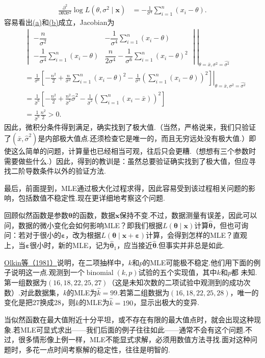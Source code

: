 \begin{example}[续\autoref{ex:7.2.11}]
\begin{align*}
\frac{\partial^2}{\partial\theta\partial\sigma^2}\log L(\theta,\sigma^2\mid\boldsymbol x)&=-\frac1{\sigma^4}\sum_{i=1}^n(x_i-\theta).
\end{align*}
容易看出\hyperref[itm:ex:7.2.12:a]{(a)}和\hyperref[itm:ex:7.2.12:b]{(b)}成立，Jacobian为
\begin{align*}
&\left.\begin{vmatrix}
-\dfrac n{\sigma^2}&-\dfrac1{\sigma^4}\sum_{i=1}^n(x_i-\theta)\\[4pt]
-\dfrac1{\sigma^4}\sum_{i=1}^n(x_i-\theta)&\dfrac n{2\sigma^4}-\dfrac1{\sigma^6}\sum_{i=1}^n(x_i-\theta)^2
\end{vmatrix}\right|_{\theta=\bar x,\sigma^2=\widehat{\sigma^2}}\\
&=\left.\frac1{\sigma^6}\left[-\frac{n^2}2+\frac n{\sigma^2}\sum_{i=1}^n(x_i-\theta)^2-\frac1{\sigma^2}\left(\sum_{i=1}^n(x_i-\theta)\right)^2\right]\right|_{\theta=\bar x,\sigma^2=\widehat{\sigma^2}}\\
&=\frac1{\widehat\sigma^6}\left[-\frac{n^2}2+\frac{n^2}{\widehat\sigma^2}\widehat\sigma^2-\frac1{\widehat\sigma^2}\left(\sum_{i=1}^n(x_i-\bar x)\right)^2\right]\\
&=\frac1{\widehat\sigma^6}\frac{n^2}2>0.
\end{align*}
因此，微积分条件得到满足，确实找到了极大值.（当然，严格说来，我们只验证了$(\bar x,\widehat\sigma^2)$是内部极大值点.还须检查它是唯一的，而且无穷远处没有极大值.）即使这么简单的问题，计算量也已经相当可观，往后只会更糟.（想想有三个参数时需要做些什么.）因此，得到的教训是：虽然总要验证确实找到了极大值，但应寻找二阶导数条件以外的验证方法.
\end{example}
最后，前面提到，MLE通过极大化过程求得，因此容易受到该过程相关问题的影响，包括数值不稳定性.现在更详细地考察这个问题.

回顾似然函数是参数$\boldsymbol\theta$的函数，数据$\boldsymbol x$保持不变.不过，数据测量有误差，因此可以问，数据的微小变化会如何影响MLE？即我们根据$L(\boldsymbol\theta\mid\boldsymbol x)$计算$\widehat{\boldsymbol\theta}$，但也可询问：若对于很小的$\boldsymbol\varepsilon$，改为根据$L(\boldsymbol\theta\mid\boldsymbol x+\boldsymbol\varepsilon)$计算，会得到怎样的MLE？直观上，当$\boldsymbol\varepsilon$很小时，新的MLE，记为$\widehat{\boldsymbol\theta}_1$，应当接近$\widehat{\boldsymbol\theta}$.但事实并非总是如此.
\begin{example}[续\autoref{ex:7.2.2}]\label{ex:7.2.13}
\hyperref[bib:source237]{Olkin等（1981）}说明，在二项抽样中，$k$和$p$的MLE可能极不稳定.他们用下面的例子说明这一点.观测到一个$\operatorname{binomial}(k,p)$试验的五个实现值，其中$k$和$p$都
未知.第一组数据为$(16,18,22,25,27)$（这是未知次数的二项试验中观测到的成功次数）.对此数据集，$k$的MLE为$\widehat k=99$.若第二组数据为$(16,18,22,25,28)$，唯一的变化是把27换成28，则$k$的MLE为$\widehat k=190$，显示出极大的变异.
\end{example}
当似然函数在最大值附近十分平坦，或不存在有限的最大值点时，就会出现这种现象.若MLE可显式求出——我们后面的例子往往如此——通常不会有这个问题.不过，很多情形像上例一样，MLE不能显式求解，必须用数值方法寻找.面对这种问题时，多花一点时间考察解的稳定性，往往是明智的.
